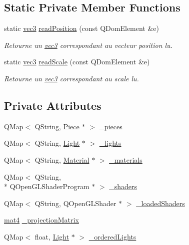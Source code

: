 \subsection*{Static Private Member Functions}
\begin{DoxyCompactItemize}
\item 
static \hyperlink{structvec3}{vec3} \hyperlink{class_scene_a98d11f40f1ac651eae91827ae9ef3d5c}{read\+Position} (const Q\+Dom\+Element \&e)
\begin{DoxyCompactList}\small\item\em Retourne un \hyperlink{structvec3}{vec3} correspondant au vecteur position lu. \end{DoxyCompactList}\item 
static \hyperlink{structvec3}{vec3} \hyperlink{class_scene_a2ea5cfec3f9be76fe110cba255621d7e}{read\+Scale} (const Q\+Dom\+Element \&e)
\begin{DoxyCompactList}\small\item\em Retourne un \hyperlink{structvec3}{vec3} correspondant au scale lu. \end{DoxyCompactList}\end{DoxyCompactItemize}
\subsection*{Private Attributes}
\begin{DoxyCompactItemize}
\item 
Q\+Map$<$ Q\+String, \hyperlink{class_piece}{Piece} $\ast$ $>$ \hyperlink{class_scene_aa3a488d4be41fe6a187488e1e7a1035c}{\+\_\+pieces}
\item 
Q\+Map$<$ Q\+String, \hyperlink{class_light}{Light} $\ast$ $>$ \hyperlink{class_scene_a0ef33120973d6afc1754d2154d7c338a}{\+\_\+lights}
\item 
Q\+Map$<$ Q\+String, \hyperlink{class_material}{Material} $\ast$ $>$ \hyperlink{class_scene_a5b96810fdeb47632d5ce6c2c47f41691}{\+\_\+materials}
\item 
Q\+Map$<$ Q\+String, \\*
Q\+Open\+G\+L\+Shader\+Program $\ast$ $>$ \hyperlink{class_scene_abde34dc03c8d3a07b3177041ab195f07}{\+\_\+shaders}
\item 
Q\+Map$<$ Q\+String, Q\+Open\+G\+L\+Shader $\ast$ $>$ \hyperlink{class_scene_a57117e4269465f070fb412f338d28bf4}{\+\_\+loaded\+Shaders}
\item 
\hyperlink{structmat4}{mat4} \hyperlink{class_scene_a7db3394191c0a07e6bdc456a53ac8ece}{\+\_\+projection\+Matrix}
\item 
Q\+Map$<$ float, \hyperlink{class_light}{Light} $\ast$ $>$ \hyperlink{class_scene_a5fae715ba6bdde7c382f9d779095a718}{\+\_\+ordered\+Lights}
\end{DoxyCompactItemize}
